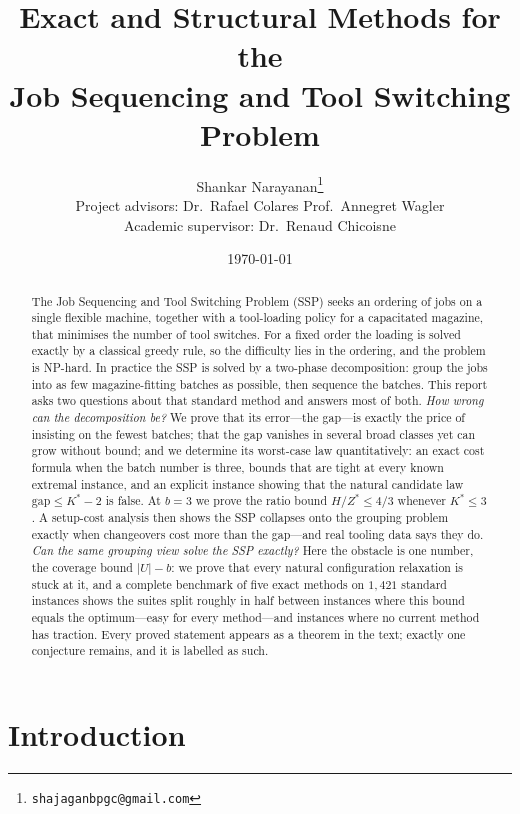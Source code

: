 \documentclass[11pt,a4paper]{article}
\title{\textbf{Exact and Structural Methods for the\\
Job Sequencing and Tool Switching Problem}}
\author{%
  Shankar Narayanan\thanks{\texttt{shajaganbpgc@gmail.com}}\\[6pt]
  \normalsize Project advisors: Dr.\ Rafael Colares \quad Prof.\ Annegret Wagler\\
  \normalsize Academic supervisor: Dr.\ Renaud Chicoisne%
}
\date{\today}
\theoremstyle{plain}
\theoremstyle{definition}
\theoremstyle{remark}
\newcommand{\U}{U}
\newcommand{\Kst}{K^{\ast}}
\newcommand{\Zst}{Z^{\ast}}
\begin{document}
\maketitle

\begin{abstract}
The Job Sequencing and Tool Switching Problem (SSP) seeks an ordering of jobs on a
single flexible machine, together with a tool-loading policy for a capacitated
magazine, that minimises the number of tool switches. For a fixed order the loading is
solved exactly by a classical greedy rule, so the difficulty lies in the ordering, and
the problem is NP-hard. In practice the SSP is solved by a two-phase
decomposition: group the jobs into as few magazine-fitting batches as possible,
then sequence the batches. This report asks two questions about that standard
method and answers most of both. \emph{How wrong can the decomposition be?} We
prove that its error---the gap---is exactly the price of insisting on the fewest
batches; that the gap vanishes in several broad classes yet can grow without
bound; and we determine its worst-case law quantitatively: an exact cost formula
when the batch number is three, bounds that are tight at every known extremal
instance, and an explicit instance showing that the natural candidate law
$\mathrm{gap}\le\Kst-2$ is false. At $b=3$ we prove the ratio bound $H/\Zst\le
4/3$ whenever $\Kst\le3$. A setup-cost analysis then shows the SSP collapses
onto the grouping problem exactly when changeovers cost more than the gap---and
real tooling data says they do. \emph{Can the same grouping view solve the SSP
exactly?} Here the obstacle is one number, the coverage bound
$\lvert\U\rvert-b$: we prove that every natural configuration relaxation is
stuck at it, and a complete benchmark of five exact methods on $1{,}421$
standard instances shows the suites split roughly in half between instances
where this bound equals the optimum---easy for every method---and instances
where no current method has traction. Every proved statement appears as a
theorem in the text; exactly one conjecture remains, and it is labelled as
such.
\end{abstract}

\tableofcontents

\section{Introduction}\label{sec:intro}
\end{document}
